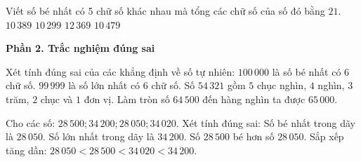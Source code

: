 \begin{ex} %
Viết số bé nhất có 5 chữ số khác nhau mà tổng các chữ số của số đó bằng $21$.
\choice
{\True $10\,389$}
{$10\,299$}
{$12\,369$}
{$10\,479$}
\end{ex}

\textbf{Phần 2. Trắc nghiệm đúng sai}

\begin{ex} %
Xét tính đúng sai của các khẳng định về số tự nhiên:
\choiceTF
{\True $100\,000$ là số bé nhất có 6 chữ số.}
{$99\,999$ là số lớn nhất có 6 chữ số.}
{\True Số $54\,321$ gồm $5$ chục nghìn, $4$ nghìn, $3$ trăm, $2$ chục và $1$ đơn vị.}
{\True Làm tròn số $64\,500$ đến hàng nghìn ta được $65\,000$.}
\end{ex}

\begin{ex} %
Cho các số: $28\,500; 34\,200; 28\,050; 34\,020$. Xét tính đúng sai:
\choiceTF
{\True Số bé nhất trong dãy là $28\,050$.}
{\True Số lớn nhất trong dãy là $34\,200$.}
{Số $28\,500$ bé hơn số $28\,050$.}
{\True Sắp xếp tăng dần: $28\,050 < 28\,500 < 34\,020 < 34\,200$.}
\end{ex}

